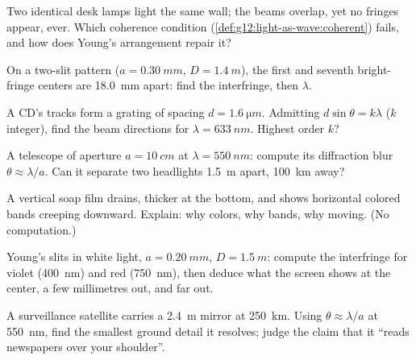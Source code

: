 \begin{exercise}[$\star\star$]\label{exo:g12:light-as-wave:8}
Two identical desk lamps light the same wall; the beams overlap, yet
no fringes appear, ever. Which coherence condition
(\cref{def:g12:light-as-wave:coherent}) fails, and how does Young's
arrangement repair it?
\end{exercise}

\begin{exercise}[$\star\star$]\label{exo:g12:light-as-wave:9}
On a two-slit pattern ($a = \qty{0.30}{mm}$, $D = \qty{1.4}{m}$), the
first and seventh bright-fringe centers are \qty{18.0}{mm} apart:
find the interfringe, then $\lambda$.
\end{exercise}

\begin{exercise}[$\star\star$]\label{exo:g12:light-as-wave:10}
A CD's tracks form a grating of spacing $d = \qty{1.6}{\micro m}$.
Admitting $d \sin\theta = k\lambda$ ($k$ integer), find the beam
directions for $\lambda = \qty{633}{nm}$. Highest order $k$?
\end{exercise}

\begin{exercise}[$\star\star$]\label{exo:g12:light-as-wave:11}
A telescope of aperture $a = \qty{10}{cm}$ at $\lambda =
\qty{550}{nm}$: compute its diffraction blur $\theta \approx
\lambda/a$. Can it separate two headlights \qty{1.5}{m} apart,
\qty{100}{km} away?
\end{exercise}

\begin{exercise}[$\star\star\star$]\label{exo:g12:light-as-wave:12}
A vertical soap film drains, thicker at the bottom, and shows
horizontal colored bands creeping downward. Explain: why colors, why
bands, why moving. (No computation.)
\end{exercise}

\begin{exercise}[$\star\star\star$]\label{exo:g12:light-as-wave:13}
Young's slits in white light, $a = \qty{0.20}{mm}$, $D = \qty{1.5}{m}$:
compute the interfringe for violet (\qty{400}{nm}) and red
(\qty{750}{nm}), then deduce what the screen shows at the center, a
few millimetres out, and far out.
\end{exercise}

\begin{exercise}[$\star\star\star$]\label{exo:g12:light-as-wave:14}
A surveillance satellite carries a \qty{2.4}{m} mirror at
\qty{250}{km}. Using $\theta \approx \lambda/a$ at \qty{550}{nm},
find the smallest ground detail it resolves; judge the claim that it
``reads newspapers over your shoulder''.
\end{exercise}

